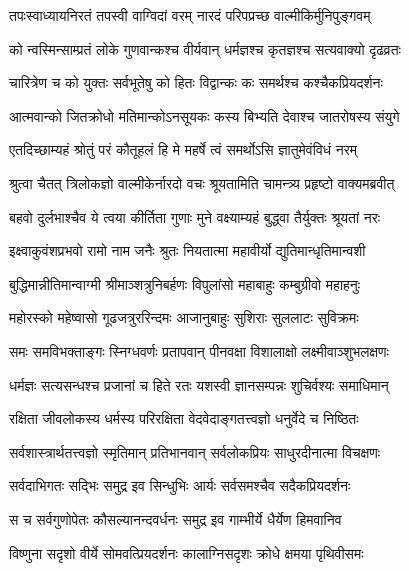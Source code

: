 

\twolineshloka
{तपःस्वाध्यायनिरतं तपस्वी वाग्विदां वरम्}
{नारदं परिपप्रच्छ वाल्मीकिर्मुनिपुङ्गवम्} %

\twolineshloka
{को न्वस्मिन्साम्प्रतं लोके गुणवान्कश्च वीर्यवान्}
{धर्मज्ञश्च कृतज्ञश्च सत्यवाक्यो दृढव्रतः} %

\twolineshloka
{चारित्रेण च को युक्तः सर्वभूतेषु को हितः}
{विद्वान्कः कः समर्थश्च कश्चैकप्रियदर्शनः} %

\twolineshloka
{आत्मवान्को जितक्रोधो मतिमान्कोऽनसूयकः}
{कस्य बिभ्यति देवाश्च जातरोषस्य संयुगे} %

\twolineshloka
{एतदिच्छाम्यहं श्रोतुं परं कौतूहलं हि मे}
{महर्षे त्वं समर्थोऽसि ज्ञातुमेवंविधं नरम्} %

\twolineshloka
{श्रुत्वा चैतत् त्रिलोकज्ञो वाल्मीकेर्नारदो वचः}
{श्रूयतामिति चामन्त्र्य प्रहृष्टो वाक्यमब्रवीत्} %

\twolineshloka
{बहवो दुर्लभाश्चैव ये त्वया कीर्तिता गुणाः}
{मुने वक्ष्याम्यहं बुद्ध्वा तैर्युक्तः श्रूयतां नरः} %

\twolineshloka
{इक्ष्वाकुवंशप्रभवो रामो नाम जनैः श्रुतः}
{नियतात्मा महावीर्यो द्युतिमान्धृतिमान्वशी} %

\twolineshloka
{बुद्धिमान्नीतिमान्वाग्मी श्रीमाञ्शत्रुनिबर्हणः}
{विपुलांसो महाबाहुः कम्बुग्रीवो महाहनुः} %

\twolineshloka
{महोरस्को महेष्वासो गूढजत्रुररिन्दमः}
{आजानुबाहुः सुशिराः सुललाटः सुविक्रमः} %

\twolineshloka
{समः समविभक्ताङ्गः स्निग्धवर्णः प्रतापवान्}
{पीनवक्षा विशालाक्षो लक्ष्मीवाञ्शुभलक्षणः} %

\twolineshloka
{धर्मज्ञः सत्यसन्धश्च प्रजानां च हिते रतः}
{यशस्वी ज्ञानसम्पन्नः शुचिर्वश्यः समाधिमान्} %

\twolineshloka
{रक्षिता जीवलोकस्य धर्मस्य परिरक्षिता}
{वेदवेदाङ्गतत्त्वज्ञो धनुर्वेदे च निष्ठितः} %

\twolineshloka
{सर्वशास्त्रार्थतत्त्वज्ञो स्मृतिमान् प्रतिभानवान्}
{सर्वलोकप्रियः साधुरदीनात्मा विचक्षणः} %

\twolineshloka
{सर्वदाभिगतः सद्भिः समुद्र इव सिन्धुभिः}
{आर्यः सर्वसमश्चैव सदैकप्रियदर्शनः} %

\twolineshloka
{स च सर्वगुणोपेतः कौसल्यानन्दवर्धनः}
{समुद्र इव गाम्भीर्ये धैर्येण हिमवानिव} %

\twolineshloka
{विष्णुना सदृशो वीर्ये सोमवत्प्रियदर्शनः}
{कालाग्निसदृशः क्रोधे क्षमया पृथिवीसमः} %

